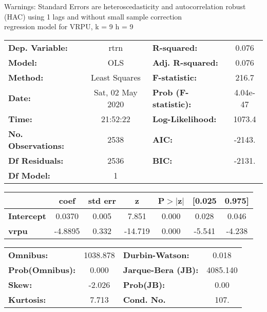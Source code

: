 Warnings: \newline
 [1] Standard Errors are heteroscedasticity and autocorrelation robust (HAC) using 1 lags and without small sample correction\\ 

regression model for VRPU, k = 9 h = 9\begin{center}
\begin{tabular}{lclc}
\toprule
\textbf{Dep. Variable:}    &       rtrn       & \textbf{  R-squared:         } &     0.076   \\
\textbf{Model:}            &       OLS        & \textbf{  Adj. R-squared:    } &     0.076   \\
\textbf{Method:}           &  Least Squares   & \textbf{  F-statistic:       } &     216.7   \\
\textbf{Date:}             & Sat, 02 May 2020 & \textbf{  Prob (F-statistic):} &  4.04e-47   \\
\textbf{Time:}             &     21:52:22     & \textbf{  Log-Likelihood:    } &    1073.4   \\
\textbf{No. Observations:} &        2538      & \textbf{  AIC:               } &    -2143.   \\
\textbf{Df Residuals:}     &        2536      & \textbf{  BIC:               } &    -2131.   \\
\textbf{Df Model:}         &           1      & \textbf{                     } &             \\
\bottomrule
\end{tabular}
\begin{tabular}{lcccccc}
                   & \textbf{coef} & \textbf{std err} & \textbf{z} & \textbf{P$> |$z$|$} & \textbf{[0.025} & \textbf{0.975]}  \\
\midrule
\textbf{Intercept} &       0.0370  &        0.005     &     7.851  &         0.000        &        0.028    &        0.046     \\
\textbf{vrpu}      &      -4.8895  &        0.332     &   -14.719  &         0.000        &       -5.541    &       -4.238     \\
\bottomrule
\end{tabular}
\begin{tabular}{lclc}
\textbf{Omnibus:}       & 1038.878 & \textbf{  Durbin-Watson:     } &    0.018  \\
\textbf{Prob(Omnibus):} &   0.000  & \textbf{  Jarque-Bera (JB):  } & 4085.140  \\
\textbf{Skew:}          &  -2.026  & \textbf{  Prob(JB):          } &     0.00  \\
\textbf{Kurtosis:}      &   7.713  & \textbf{  Cond. No.          } &     107.  \\
\bottomrule
\end{tabular}
\end{center}

